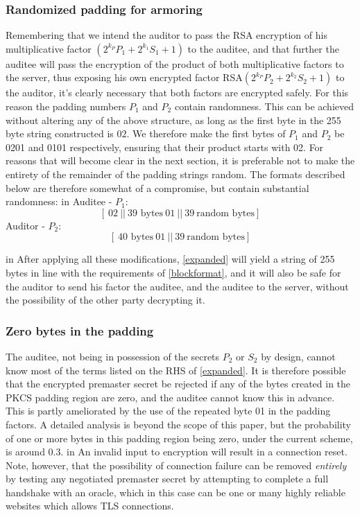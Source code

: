 \documentclass[10pt,a4paper]{article}
\begin{document}
\subsubsection{Randomized padding for armoring}
\noindent Remembering that we intend the auditor to pass the RSA encryption of his multiplicative factor $(2^{k_P}P_1+2^{k_1}S_1+1)$ to the auditee, and that further the auditee will pass the encryption of the product of both multiplicative factors to the server, thus exposing his own encrypted factor RSA$(2^{k_P}P_2+2^{k_2}S_2+1)$ to the auditor, it's clearly necessary that both factors are encrypted safely. For this reason the padding numbers $P_1$ and $P_2$ contain randomness. This can be achieved without altering any of the above structure, as long as the first byte in the 255 byte string constructed is $02$. We therefore make the first bytes of $P_1$ and $P_2$ be 0201 and 0101 respectively, ensuring that their product starts with 02. For reasons that will become clear in the next section, it is preferable not to make the entirety of the remainder of the padding strings random. The formats described below are therefore somewhat of a compromise, but contain substantial randomness:
 in 
\noindent Auditee - $P_1$:
\begin{equation}\label{auditee_padding}
[ \ 02\ ||\ \textrm{39 bytes}\ 01\ ||\ 39\ \textrm{random bytes} ] 
\end{equation}
\noindent Auditor - $P_2$:
\begin{equation}\label{auditor_padding}
[\ \textrm{40 bytes}\ 01\ ||\ 39\ \textrm{random bytes} ] 
\end{equation}

 in 
\noindent After applying all these modifications, \eqref{expanded} will yield a string of 255 bytes in line with the requirements of \eqref{blockformat}, and it will also be safe for the auditor to send his factor the auditee, and the auditee to the server, without the possibility of the other party decrypting it.

\subsubsection{Zero bytes in the padding}
\noindent The auditee, not being in possession of the secrets $P_2$ or $S_2$ by design, cannot know most of the terms listed on the RHS of \eqref{expanded}. It is therefore possible that the encrypted premaster secret be rejected if any of the bytes created in the PKCS padding region are zero, and the auditee cannot know this in advance. This is partly ameliorated by the use of the repeated byte 01 in the padding factors. A detailed analysis is beyond the scope of this paper, but the probability of one or more bytes in this padding region being zero, under the current scheme, is around 0.3.
 in
\noindent An invalid input to encryption will result in a connection reset. Note, however, that the possibility of connection failure can be removed \emph{entirely} by testing any negotiated premaster secret by attempting to complete a full handshake with an oracle, which in this case can be one or many highly reliable websites which allows TLS connections.
\end{document}
